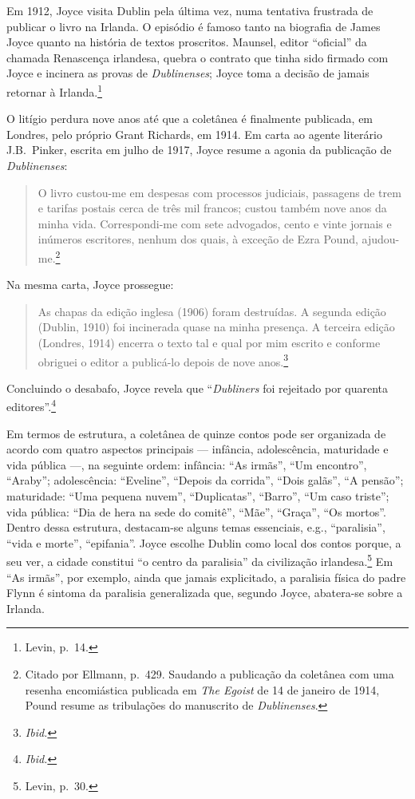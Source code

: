 Em 1912, Joyce visita Dublin pela última vez, numa tentativa frustrada de
publicar o livro na Irlanda. O episódio é famoso tanto na biografia de James
Joyce quanto na história de textos proscritos. Maunsel, editor “oficial” da
chamada Renascença irlandesa, quebra o contrato que tinha sido firmado com
Joyce e incinera as provas de \textit{Dublinenses}; Joyce toma a decisão de
jamais retornar à Irlanda.\footnote{ Levin, p.~14.}

O litígio perdura nove anos até que a coletânea é finalmente publicada, em
Londres, pelo próprio Grant Richards, em 1914. Em carta ao agente literário J.B.~Pinker,
escrita em julho de 1917, Joyce resume a agonia da publicação de
\textit{Dublinenses}: 

\begin{quote}
O livro custou-me em despesas com processos judiciais,
passagens de trem e tarifas postais cerca de três mil francos; custou também
nove anos da minha vida.  Correspondi-me com sete advogados, cento e vinte
jornais e inúmeros escritores, nenhum dos quais, à exceção de Ezra Pound,
ajudou-me.\footnote{  Citado por Ellmann, p.~429. Saudando a publicação da
coletânea com uma resenha encomiástica publicada em \textit{The
Egoist} de 14 de janeiro de 1914, Pound resume as tribulações do
manuscrito de \textit{Dublinenses}.} 
\end{quote}

Na mesma carta, Joyce prossegue: 

\begin{quote}
As chapas da edição inglesa (1906) foram destruídas. A segunda edição (Dublin, 1910) foi
incinerada quase na minha presença. A terceira edição (Londres, 1914) encerra o
texto tal e qual por mim escrito e conforme obriguei o editor a publicá-lo
depois de nove anos.\footnote{ \textit{Ibid.}}
\end{quote}

Concluindo o desabafo, Joyce revela que
“\textit{Dubliners} foi rejeitado por quarenta editores”.\footnote{ \textit{Ibid.}}

Em termos de estrutura, a coletânea de quinze contos pode ser organizada de
acordo com quatro aspectos principais --- infância, adolescência, maturidade
e vida pública ---, na seguinte ordem: infância: “As irmãs”, “Um encontro”,
“Araby”; adolescência: “Eveline”, “Depois da corrida”, “Dois galãs”, “A
pensão”; maturidade: “Uma pequena nuvem”, “Duplicatas”, “Barro”, “Um caso
triste”; vida pública: “Dia de hera na sede do comitê”, “Mãe”, “Graça”, “Os
mortos”. Dentro dessa estrutura, destacam-se alguns temas essenciais, e.g.,
“paralisia”, “vida e morte”, “epifania”.  Joyce escolhe Dublin como local dos
contos porque, a seu ver, a cidade constitui “o centro da paralisia” da
civilização irlandesa.\footnote{ Levin, p.~30.} Em “As irmãs”, por exemplo, ainda que
jamais explicitado, a paralisia física do padre Flynn é sintoma da paralisia
generalizada que, segundo Joyce, abatera-se sobre a Irlanda.

